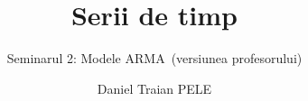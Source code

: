 \title[Serii de timp]{Serii de timp}
\subtitle{Seminarul 2: Modele ARMA\ifsolutions\ (versiunea profesorului)\fi}
\author[D.T. Pele]{Daniel Traian PELE}
\date{}

\providecommand{\tsaapplink}[3]{\hypertarget{#2}{}\hyperlink{#1}{\beamergotobutton{#3}}}  %
\providecommand{\tsaappback}[2]{\begin{tikzpicture}[remember picture,overlay]\node[anchor=south east] at ([xshift=-3mm,yshift=7mm]current page.south east){\hyperlink{#1}{\beamerreturnbutton{#2}}};\end{tikzpicture}}  %
\providecommand{\tsachlink}[2]{\href{#1}{#2}}  %
\providecommand{\tsachlinkt}[2]{\href{#1}{\usebeamercolor[fg]{frametitle}#2}}  %



